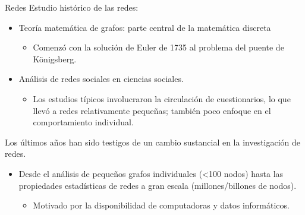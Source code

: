 \documentclass[11pt]{beamer}
\begin{document}
\begin{frame}{Redes}
Estudio histórico de las redes:
    \begin{itemize}
        \item Teoría matemática de grafos: parte central de la matemática discreta
\begin{itemize}
    \item Comenzó con la solución de Euler de 1735 al problema del puente de Königsberg.
\end{itemize}
\item Análisis de redes sociales en ciencias sociales.
\begin{itemize}
    \item Los estudios típicos involucraron la circulación de cuestionarios, lo que llevó a redes relativamente pequeñas; también poco enfoque en el comportamiento individual.
\end{itemize}
    \end{itemize}

Los últimos años han sido testigos de un cambio sustancial en la investigación de redes.
\begin{itemize}
    \item Desde el análisis de pequeños grafos individuales (<100 nodos) hasta las propiedades estadísticas de redes a gran escala (millones/billones de nodos).
    \begin{itemize}
        \item Motivado por la disponibilidad de computadoras y datos informáticos.
    \end{itemize}
\end{itemize} 
\end{frame}
\end{document}
